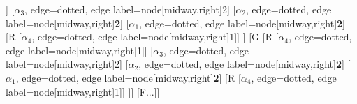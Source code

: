 \begin{forest}
[B
	[F
		[G
			[R
				[$\alpha_{4}$, edge=dotted, edge label={node[midway,right]{1}}]]
			[$\alpha_{3}$, edge=dotted, edge label={node[midway,right]{2}}]
			[$\alpha_{2}$, edge=dotted, edge label={node[midway,right]{\textbf{2}}}]
			[$\alpha_{1}$, edge=dotted, edge label={node[midway,right]{\textbf{2}}}]
			[R
				[$\alpha_{4}$, edge=dotted, edge label={node[midway,right]{1}}]]
		]
		[G
			[R
				[$\alpha_{4}$, edge=dotted, edge label={node[midway,right]{1}}]]
			[$\alpha_{3}$, edge=dotted, edge label={node[midway,right]{2}}]
			[$\alpha_{2}$, edge=dotted, edge label={node[midway,right]{\textbf{2}}}]
			[$\alpha_{1}$, edge=dotted, edge label={node[midway,right]{\textbf{2}}}]
			[R
				[$\alpha_{4}$, edge=dotted, edge label={node[midway,right]{1}}]]
		]]
	[F...]]
\end{forest}
